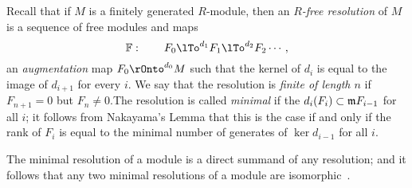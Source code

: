 Recall
that if $M$ is a finitely generated $R$-module, then an \emph{$R$-free resolution} of $M$ is a sequence of free modules and maps
$$
\FF:\qquad F_{0} \lTo^{d_{1}} F_{1}\lTo^{d_{2}} F_{2}\cdots,
$$
an \emph{augmentation} map $F_{0} \rOnto^{d_{0}} M$ such that the kernel of $d_{i}$ is equal to the image of $d_{i+1}$ for every $i$. We say that the resolution is \emph{finite of length $n$} if $F_{n+1}= 0$ but $F_{n}\neq 0$.The resolution is called \emph{minimal} if the $d_{i}(F_{i}) \subset \gm F_{i-1}$ for all $i$; it follows from Nakayama's Lemma that this is the case if and only if the rank of $F_{i}$ is equal to the minimal
number of generates of $\ker d_{i-1}$ for all $i$. 

The minimal resolution of a module is a direct summand of any resolution; and it follows that any two minimal resolutions of a module are isomorphic~\cite[Theorem ***]{E}. 

